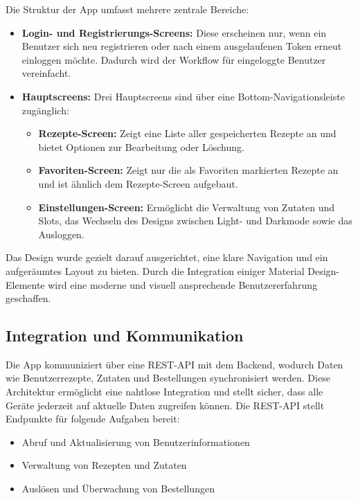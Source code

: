 Die Struktur der App umfasst mehrere zentrale Bereiche:

\begin{itemize}
    \item \textbf{Login- und Registrierungs-Screens:} Diese erscheinen nur, wenn ein Benutzer sich neu registrieren oder nach einem ausgelaufenen Token erneut einloggen möchte. Dadurch wird der Workflow für eingeloggte Benutzer vereinfacht.
    \item \textbf{Hauptscreens:} Drei Hauptscreens sind über eine Bottom-Navigationsleiste zugänglich:
    \begin{itemize}
        \item \textbf{Rezepte-Screen:} Zeigt eine Liste aller gespeicherten Rezepte an und bietet Optionen zur Bearbeitung oder Löschung.
        \item \textbf{Favoriten-Screen:} Zeigt nur die als Favoriten markierten Rezepte an und ist ähnlich dem Rezepte-Screen aufgebaut.
        \item \textbf{Einstellungen-Screen:} Ermöglicht die Verwaltung von Zutaten und Slots, das Wechseln des Designs zwischen Light- und Darkmode sowie das Ausloggen.
    \end{itemize}
\end{itemize}

Das Design wurde gezielt darauf ausgerichtet, eine klare Navigation und ein aufgeräumtes Layout zu bieten. Durch die Integration einiger Material Design-Elemente wird eine moderne und visuell ansprechende Benutzererfahrung geschaffen.

\subsection{Integration und Kommunikation}
Die App kommuniziert über eine REST-API mit dem Backend, wodurch Daten wie Benutzerrezepte, Zutaten und Bestellungen synchronisiert werden. Diese Architektur ermöglicht eine nahtlose Integration und stellt sicher, dass alle Geräte jederzeit auf aktuelle Daten zugreifen können. Die REST-API stellt Endpunkte für folgende Aufgaben bereit:

\begin{itemize}
    \item Abruf und Aktualisierung von Benutzerinformationen
    \item Verwaltung von Rezepten und Zutaten
    \item Auslösen und Überwachung von Bestellungen
\end{itemize}

